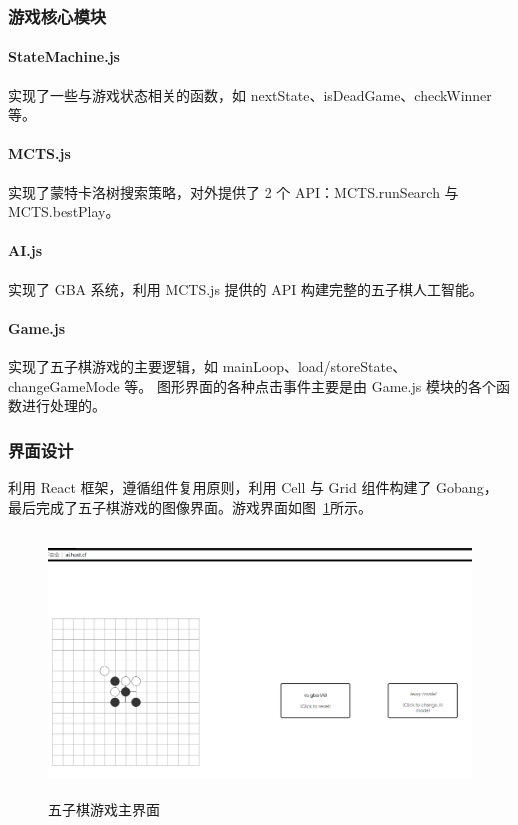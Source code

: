 \documentclass[UTF8,cs4size]{ctexart}
\begin{document}
\subsubsection{游戏核心模块}
\paragraph{StateMachine.js}
实现了一些与游戏状态相关的函数，如 nextState、isDeadGame、checkWinner 等。
\paragraph{MCTS.js}
实现了蒙特卡洛树搜索策略，对外提供了 2 个 API：MCTS.runSearch 与 MCTS.bestPlay。
\paragraph{AI.js}
实现了 GBA 系统，利用 MCTS.js 提供的 API 构建完整的五子棋人工智能。
\paragraph{Game.js}
实现了五子棋游戏的主要逻辑，如 mainLoop、load/storeState、changeGameMode 等。
图形界面的各种点击事件主要是由 Game.js 模块的各个函数进行处理的。
\subsubsection{界面设计}
利用 React 框架，遵循组件复用原则，利用 Cell 与 Grid 组件构建了 Gobang，
最后完成了五子棋游戏的图像界面。游戏界面如图~\ref{fig:UI}所示。

\begin{figure}[htb]
  \centering
  \includegraphics[width=\textwidth,height=7cm]{figures/final_UI.png}
  \caption{五子棋游戏主界面}
  \label{fig:UI}
\end{figure}
\end{document}
